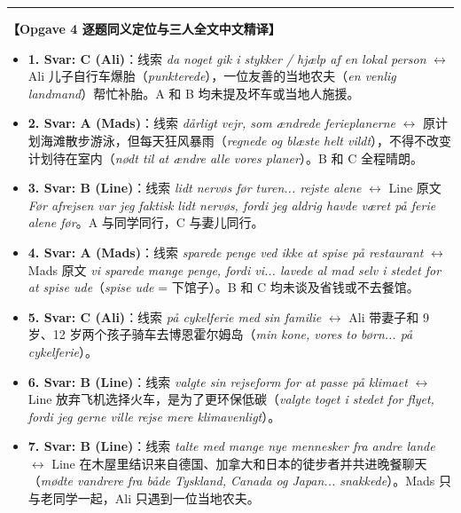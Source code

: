 \begin{answerbox}
\vspace{0.45em}
\hrule
\vspace{0.45em}
\textbf{\color{NCDNavy}【Opgave 4 逐题同义定位与三人全文中文精译】}
\begin{itemize}
  \item \textbf{1. Svar: C (Ali)}：线索 \textit{da noget gik i stykker / hjælp af en lokal person} $\leftrightarrow$ Ali 儿子自行车爆胎（\textit{punkterede}），一位友善的当地农夫（\textit{en venlig landmand}）帮忙补胎。A 和 B 均未提及坏车或当地人施援。
  \item \textbf{2. Svar: A (Mads)}：线索 \textit{dårligt vejr, som ændrede ferieplanerne} $\leftrightarrow$ 原计划海滩散步游泳，但每天狂风暴雨（\textit{regnede og blæste helt vildt}），不得不改变计划待在室内（\textit{nødt til at ændre alle vores planer}）。B 和 C 全程晴朗。
  \item \textbf{3. Svar: B (Line)}：线索 \textit{lidt nervøs før turen... rejste alene} $\leftrightarrow$ Line 原文 \textit{Før afrejsen var jeg faktisk lidt nervøs, fordi jeg aldrig havde været på ferie alene før}。A 与同学同行，C 与妻儿同行。
  \item \textbf{4. Svar: A (Mads)}：线索 \textit{sparede penge ved ikke at spise på restaurant} $\leftrightarrow$ Mads 原文 \textit{vi sparede mange penge, fordi vi... lavede al mad selv i stedet for at spise ude}（\textit{spise ude} = 下馆子）。B 和 C 均未谈及省钱或不去餐馆。
  \item \textbf{5. Svar: C (Ali)}：线索 \textit{på cykelferie med sin familie} $\leftrightarrow$ Ali 带妻子和 9 岁、12 岁两个孩子骑车去博恩霍尔姆岛（\textit{min kone, vores to børn... på cykelferie}）。
  \item \textbf{6. Svar: B (Line)}：线索 \textit{valgte sin rejseform for at passe på klimaet} $\leftrightarrow$ Line 放弃飞机选择火车，是为了更环保低碳（\textit{valgte toget i stedet for flyet, fordi jeg gerne ville rejse mere klimavenligt}）。
  \item \textbf{7. Svar: B (Line)}：线索 \textit{talte med mange nye mennesker fra andre lande} $\leftrightarrow$ Line 在木屋里结识来自德国、加拿大和日本的徒步者并共进晚餐聊天（\textit{mødte vandrere fra både Tyskland, Canada og Japan... snakkede}）。Mads 只与老同学一起，Ali 只遇到一位当地农夫。
\end{itemize}


\end{answerbox}
